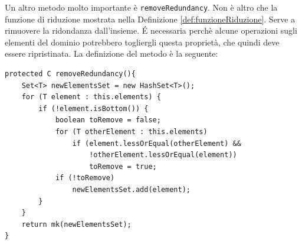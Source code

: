 Un altro metodo molto importante è \texttt{removeRedundancy}. Non è altro che la funzione di riduzione mostrata nella Definizione \ref{def:funzioneRiduzione}. Serve a rimuovere la ridondanza dall'insieme. \'E necessaria perchè alcune operazioni sugli elementi del dominio potrebbero togliergli questa proprietà, che quindi deve essere ripristinata. La definizione del metodo è la seguente:
\begin{lstlisting}[belowskip=-1.1 \baselineskip]
protected C removeRedundancy(){
    Set<T> newElementsSet = new HashSet<T>();
    for (T element : this.elements) {
        if (!element.isBottom()) {
            boolean toRemove = false;
            for (T otherElement : this.elements)
                if (element.lessOrEqual(otherElement) && 
                    !otherElement.lessOrEqual(element))
                    toRemove = true;
            if (!toRemove)
                newElementsSet.add(element);
        }
    }
    return mk(newElementsSet);
}
\end{lstlisting}

